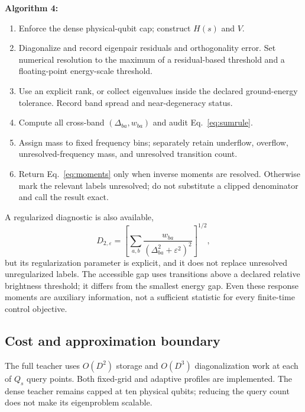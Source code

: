 \documentclass[10pt]{article}
\newcommand{\code}[1]{\texttt{\detokenize{#1}}}
\newenvironment{algsteps}[1]{\par\smallskip\noindent\textbf{Algorithm #1}\begin{enumerate}\setlength{\itemsep}{2pt}\setlength{\parskip}{1pt}}{\end{enumerate}\smallskip}
\begin{document}
\begin{algsteps}{4: \code{spectral_teacher(terms, s, ...)} }
\item Enforce the dense physical-qubit cap; construct $H(s)$ and $V$.
\item Diagonalize and record eigenpair residuals and orthogonality error.
       Set numerical resolution to the maximum of a residual-based threshold
       and a floating-point energy-scale threshold.
\item Use an explicit rank, or collect eigenvalues inside the declared
       ground-energy tolerance. Record band spread and near-degeneracy status.
\item Compute all cross-band $(\Delta_{ba},w_{ba})$ and audit Eq.~\eqref{eq:sumrule}.
\item Assign mass to fixed frequency bins; separately retain underflow,
       overflow, unresolved-frequency mass, and unresolved transition count.
\item Return Eq.~\eqref{eq:moments} only when inverse moments are resolved.
       Otherwise mark the relevant labels unresolved; do not substitute
       a clipped denominator and call the result exact.
\end{algsteps}
A regularized diagnostic is also available,
\begin{equation}
 D_{2,\varepsilon}=\left[\sum_{a,b}
       \frac{w_{ba}}{(\Delta_{ba}^2+\varepsilon^2)^2}\right]^{1/2},
\end{equation}
but its regularization parameter is explicit, and it does not replace unresolved
unregularized labels. The accessible gap uses transitions above a declared
relative brightness threshold; it differs from the smallest energy gap.
Even these response moments are auxiliary information, not a sufficient
statistic for every finite-time control objective.

\subsection{Cost and approximation boundary}
The full teacher uses $O(D^2)$ storage and $O(D^3)$ diagonalization work at
each of $Q_s$ query points. Both fixed-grid and adaptive profiles are implemented.
The dense teacher remains capped at ten physical qubits; reducing the query
count does not make its eigenproblem scalable.
\end{document}
